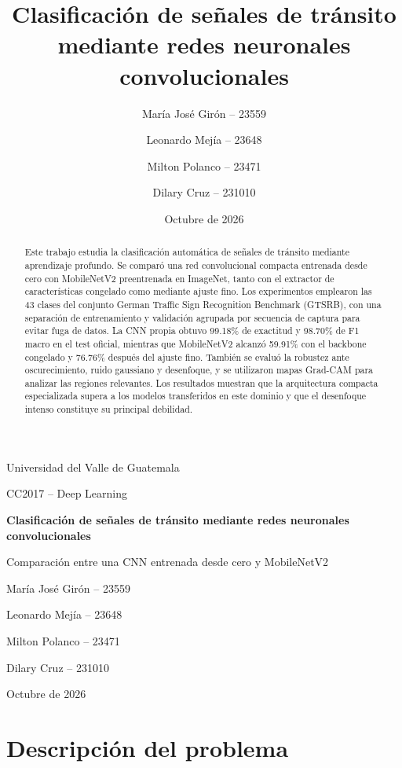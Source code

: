 \documentclass[11pt,letterpaper]{article}
\title{Clasificaci\'on de se\~nales de tr\'ansito mediante redes neuronales convolucionales}
\author{Mar\'ia Jos\'e Gir\'on -- 23559 \and Leonardo Mej\'ia -- 23648 \and Milton Polanco -- 23471 \and Dilary Cruz -- 231010}
\date{Octubre de 2026}
\begin{document}
\begin{titlepage}
    \centering
    {\large Universidad del Valle de Guatemala\par}
    \vspace{0.5cm}
    {\large CC2017 -- Deep Learning\par}
    \vfill
    {\LARGE\bfseries Clasificaci\'on de se\~nales de tr\'ansito mediante redes neuronales convolucionales\par}
    \vspace{0.8cm}
    {\large Comparaci\'on entre una CNN entrenada desde cero y MobileNetV2\par}
    \vfill
    {\large Mar\'ia Jos\'e Gir\'on -- 23559\par}
    {\large Leonardo Mej\'ia -- 23648\par}
    {\large Milton Polanco -- 23471\par}
    {\large Dilary Cruz -- 231010\par}
    \vfill
    {\large Octubre de 2026\par}
\end{titlepage}

\tableofcontents
\listoffigures
\listoftables
\clearpage
{}

\begin{abstract}
Este trabajo estudia la clasificaci\'on autom\'atica de se\~nales de tr\'ansito mediante aprendizaje profundo. Se compar\'o una red convolucional compacta entrenada desde cero con MobileNetV2 preentrenada en ImageNet, tanto con el extractor de caracter\'isticas congelado como mediante ajuste fino. Los experimentos emplearon las 43 clases del conjunto German Traffic Sign Recognition Benchmark (GTSRB), con una separaci\'on de entrenamiento y validaci\'on agrupada por secuencia de captura para evitar fuga de datos. La CNN propia obtuvo 99.18\% de exactitud y 98.70\% de F1 macro en el test oficial, mientras que MobileNetV2 alcanz\'o 59.91\% con el backbone congelado y 76.76\% despu\'es del ajuste fino. Tambi\'en se evalu\'o la robustez ante oscurecimiento, ruido gaussiano y desenfoque, y se utilizaron mapas Grad-CAM para analizar las regiones relevantes. Los resultados muestran que la arquitectura compacta especializada supera a los modelos transferidos en este dominio y que el desenfoque intenso constituye su principal debilidad.
\end{abstract}

\section{Descripci\'on del problema}
\end{document}
